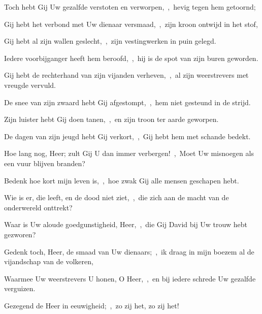 \documentclass[12pt,twoside,a5paper]{article}
\begin{document}
\begin{halfparskip}

  Toch hebt Gij Uw gezalfde verstoten en verworpen,~\sep\ hevig tegen hem getoornd;

  Gij hebt het verbond met Uw dienaar versmaad,~\sep\ zijn kroon ontwijd in het stof,

  Gij hebt al zijn wallen geslecht,~\sep\ zijn vestingwerken in puin gelegd.

  Iedere voorbijganger heeft hem beroofd,~\sep\ hij is de spot van zijn buren geworden.

  Gij hebt de rechterhand van zijn vijanden verheven,~\sep\ al zijn weerstrevers met vreugde vervuld.

  De snee van zijn zwaard hebt Gij afgestompt,~\sep\ hem niet gesteund in de strijd.

  Zijn luister hebt Gij doen tanen,~\sep\ en zijn troon ter aarde geworpen.

  De dagen van zijn jeugd hebt Gij verkort,~\sep\ Gij hebt hem met schande bedekt.
\end{halfparskip}

\begin{halfparskip}

  Hoe lang nog, Heer; zult Gij U dan immer verbergen!~\sep\ Moet Uw misnoegen als een vuur blijven branden?

  Bedenk hoe kort mijn leven is,~\sep\ hoe zwak Gij alle mensen geschapen hebt.

  Wie is er, die leeft, en de dood niet ziet,~\sep\ die zich aan de macht van de onderwereld onttrekt?

  Waar is Uw aloude goedgunstigheid, Heer,~\sep\ die Gij David bij Uw trouw hebt gezworen?

  Gedenk toch, Heer, de smaad van Uw dienaars;~\sep\ ik draag in mijn boezem al de vijandschap van de volkeren,

  Waarmee Uw weerstrevers U honen, O Heer,~\sep\ en bij iedere schrede Uw gezalfde verguizen.

  Gezegend de Heer in eeuwigheid;~\sep\ zo zij het, zo zij het!
\end{halfparskip}

\end{document}
